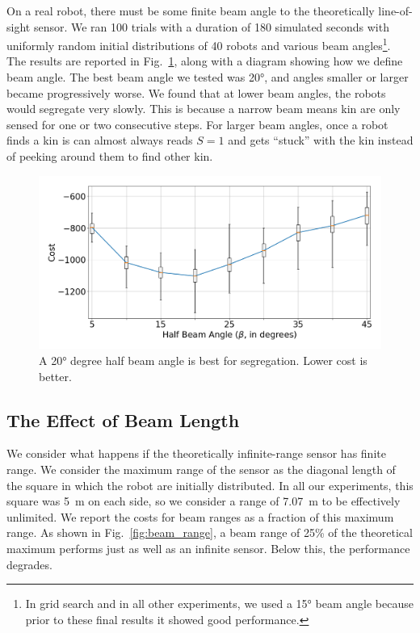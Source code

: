 \documentclass[letterpaper, 10 pt, conference]{ieeeconf}
\begin{document}
On a real robot, there must be some finite beam angle to the theoretically
line-of-sight sensor. We ran 100 trials with a duration of 180 simulated seconds
with uniformly random initial distributions of 40 robots and various beam
angles\footnote{In grid search and in all other experiments, we used a \ang{15} beam angle because prior to these final results it showed good performance.}.
The results are reported in Fig.~\ref{fig:beam_angle}, along with a
diagram showing how we define beam angle. The best beam angle we tested was
\ang{20}, and angles smaller or larger became progressively worse. We found that
at lower beam angles, the robots would segregate very slowly. This is because a narrow beam
means kin are only sensed for one or two consecutive steps.
For larger beam angles, once a robot finds a kin is can almost always reads $S=1$
and gets ``stuck'' with the kin instead of peeking around them to find other kin.

\begin{figure}[t]
  \centering
  \includegraphics[width=0.9\linewidth]{./images/beam_angle}
  \caption{A \ang{20} degree half beam angle is best for segregation. Lower cost
    is better.}
  \label{fig:beam_angle}
\end{figure}

\subsection{The Effect of Beam Length} \label{section:beam_range}

We consider what happens if the theoretically infinite-range sensor has finite
range. We consider the maximum range of the sensor as the
diagonal length of the square in which the robot are initially distributed. In
all our experiments, this square was \SI{5}{\meter} on each side, so we consider
a range of \SI{7.07}{\meter} to be effectively unlimited. We report the costs
for beam ranges as a fraction of this maximum range. As shown in
Fig.~\ref{fig:beam_range}, a beam range of 25\% of the theoretical maximum
performs just as well as an infinite sensor. Below this, the performance
degrades.
\end{document}
